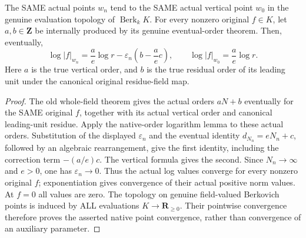 \begin{theorem}
\label{thm:gauss-surface-actual-fixed-radius-convergence}
\leanok
\leavevmode\par
{}
The SAME actual points $w_n$ tend to the SAME actual vertical point
$w_0$ in the genuine evaluation topology of $\operatorname{Berk}_k K$.
For every nonzero original $f\in K$, let $a,b\in\mathbf Z$ be internally
produced by its genuine eventual-order theorem. Then, eventually,
\[
 \log|f|_{w_n}=\frac{a}{e}\log r
       -\varepsilon_n\left(b-\frac{a}{e}c\right),\qquad
 \log|f|_{w_0}=\frac{a}{e}\log r.
\]
Here $a$ is the true vertical order, and $b$ is the true residual order
of its leading unit under the canonical original residue-field map.
\end{theorem}
\begin{proof}
The old whole-field theorem gives the actual orders $aN+b$ eventually
for the SAME original $f$, together with its actual vertical order and
canonical leading-unit residue. Apply the native-order logarithm lemma
to these actual orders. Substitution of the displayed $\varepsilon_n$
and the eventual identity $d_{N_n}=eN_n+c$, followed by an algebraic
rearrangement, give the first identity, including the
correction term $-(a/e)c$. The vertical formula gives the second.
Since $N_n\to\infty$ and $e>0$, one has $\varepsilon_n\to0$.
Thus the actual log values converge for every nonzero original $f$;
exponentiation gives convergence of their actual positive norm values.
At $f=0$ all values are zero. The topology on genuine field-valued
Berkovich points is induced by ALL evaluations $K\to\mathbf R_{\ge0}$.
Their pointwise convergence therefore proves the asserted native
point convergence, rather than convergence of an auxiliary parameter.
\end{proof}

